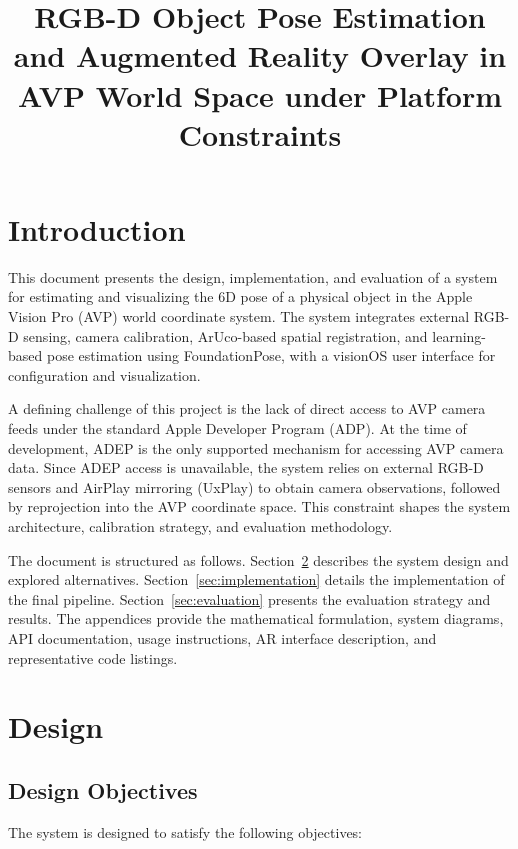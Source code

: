 \documentclass[11pt]{article}
\title{RGB-D Object Pose Estimation and Augmented Reality Overlay in AVP World Space under Platform Constraints}
\author{}
\date{}
\begin{document}
\maketitle

\section{Introduction}

This document presents the design, implementation, and evaluation of a system for estimating and visualizing the $6$D pose of a physical object in the Apple Vision Pro (AVP) world coordinate system. The system integrates external RGB-D sensing, camera calibration, ArUco-based spatial registration, and learning-based pose estimation using FoundationPose, with a visionOS user interface for configuration and visualization.

A defining challenge of this project is the lack of direct access to AVP camera feeds under the standard Apple Developer Program (ADP). At the time of development, ADEP is the only supported mechanism for accessing AVP camera data. Since ADEP access is unavailable, the system relies on external RGB-D sensors and AirPlay mirroring (UxPlay) to obtain camera observations, followed by reprojection into the AVP coordinate space. This constraint shapes the system architecture, calibration strategy, and evaluation methodology.

The document is structured as follows. Section~\ref{sec:design} describes the system design and explored alternatives. Section~\ref{sec:implementation} details the implementation of the final pipeline. Section~\ref{sec:evaluation} presents the evaluation strategy and results. The appendices provide the mathematical formulation, system diagrams, API documentation, usage instructions, AR interface description, and representative code listings.

\section{Design}
\label{sec:design}

\subsection{Design Objectives}

The system is designed to satisfy the following objectives:
\end{document}
